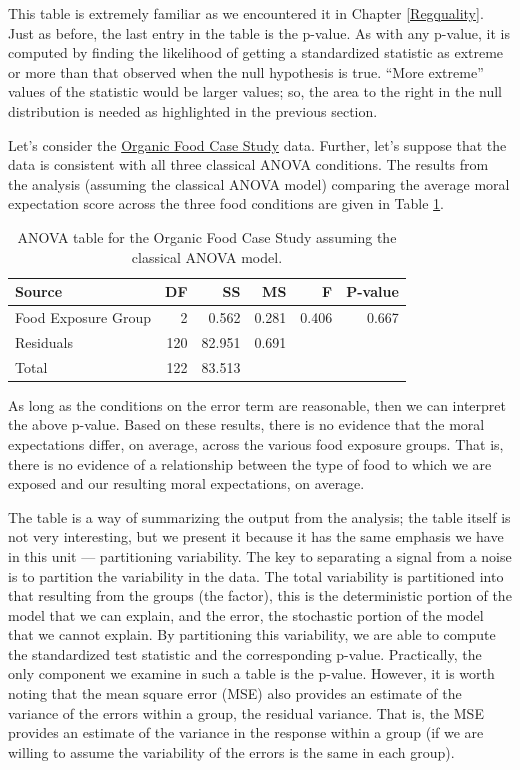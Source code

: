 \documentclass[
]{book}
\theoremstyle{plain}
\theoremstyle{mydefn}
\theoremstyle{myexmpl}
\theoremstyle{remark}
\begin{document}
This table is extremely familiar as we encountered it in Chapter \ref{Regquality}. Just as before, the last entry in the table is the p-value. As with any p-value, it is computed by finding the likelihood of getting a standardized statistic as extreme or more than that observed when the null hypothesis is true. ``More extreme'' values of the statistic would be larger values; so, the area to the right in the null distribution is needed as highlighted in the previous section.

Let's consider the \protect\hyperlink{CaseOrganic}{Organic Food Case Study} data. Further, let's suppose that the data is consistent with all three classical ANOVA conditions. The results from the analysis (assuming the classical ANOVA model) comparing the average moral expectation score across the three food conditions are given in Table \ref{tab:anovateststat-organic-anova-table}.

\begin{table}

\caption{\label{tab:anovateststat-organic-anova-table}ANOVA table for the Organic Food Case Study assuming the classical ANOVA model.}
\centering
\begin{tabular}[t]{l|r|r|r|r|r}
\hline
Source & DF & SS & MS & F & P-value\\
\hline
Food Exposure Group & 2 & 0.562 & 0.281 & 0.406 & 0.667\\
\hline
Residuals & 120 & 82.951 & 0.691 &  & \\
\hline
Total & 122 & 83.513 &  &  & \\
\hline
\end{tabular}
\end{table}

As long as the conditions on the error term are reasonable, then we can interpret the above p-value. Based on these results, there is no evidence that the moral expectations differ, on average, across the various food exposure groups. That is, there is no evidence of a relationship between the type of food to which we are exposed and our resulting moral expectations, on average.

The table is a way of summarizing the output from the analysis; the table itself is not very interesting, but we present it because it has the same emphasis we have in this unit --- partitioning variability. The key to separating a signal from a noise is to partition the variability in the data. The total variability is partitioned into that resulting from the groups (the factor), this is the deterministic portion of the model that we can explain, and the error, the stochastic portion of the model that we cannot explain. By partitioning this variability, we are able to compute the standardized test statistic and the corresponding p-value. Practically, the only component we examine in such a table is the p-value. However, it is worth noting that the mean square error (MSE) also provides an estimate of the variance of the errors within a group, the residual variance. That is, the MSE provides an estimate of the variance in the response within a group (if we are willing to assume the variability of the errors is the same in each group).
\end{document}
